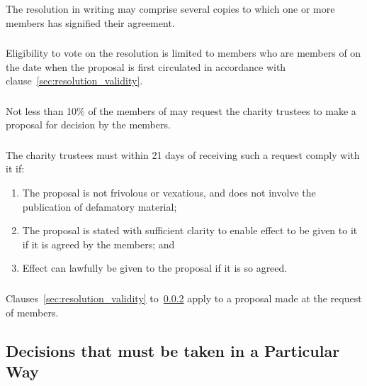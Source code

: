         \subsubsection{}
        The resolution in writing may comprise several copies to which one or more members has signified their agreement.

        \subsubsection{}\label{sec:voting_eligibility}
        Eligibility to vote on the resolution is limited to members who are members of \shortname{} on the date when the proposal is first circulated in accordance with clause~\ref{sec:resolution_validity}.

        \subsubsection{}
        Not less than 10\% of the members of \shortname{} may request the charity trustees to make a proposal for decision by the members.

        \subsubsection{}
        The charity trustees must within 21 days of receiving such a request comply with it if:
        \begin{enumerate}
            \item The proposal is not frivolous or vexatious, and does not involve the publication of defamatory material;
            \item The proposal is stated with sufficient clarity to enable effect to be given to it if it is agreed by the members; and
            \item Effect can lawfully be given to the proposal if it is so agreed.
        \end{enumerate}

        \subsubsection{}
        Clauses~\ref{sec:resolution_validity} to~\ref{sec:voting_eligibility} apply to a proposal made at the request of members.


    \subsection{Decisions that must be taken in a Particular Way}\label{sec:decisions_particular}

